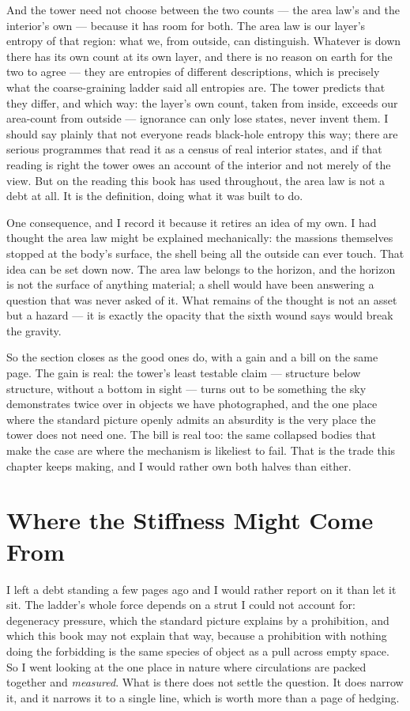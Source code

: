 \documentclass[fontsize=11pt,paper=a4,pagesize=auto,parskip=half-]{scrbook}
\begin{document}
And the tower need not choose between the two counts --- the area law's and the interior's own --- because it has room for both. The area law is our layer's entropy of that region: what we, from outside, can distinguish. Whatever is down there has its own count at its own layer, and there is no reason on earth for the two to agree --- they are entropies of different descriptions, which is precisely what the coarse-graining ladder said all entropies are. The tower predicts that they differ, and which way: the layer's own count, taken from inside, exceeds our area-count from outside --- ignorance can only lose states, never invent them. I should say plainly that not everyone reads black-hole entropy this way; there are serious programmes that read it as a census of real interior states, and if that reading is right the tower owes an account of the interior and not merely of the view. But on the reading this book has used throughout, the area law is not a debt at all. It is the definition, doing what it was built to do.

One consequence, and I record it because it retires an idea of my own. I had thought the area law might be explained mechanically: the massions themselves stopped at the body's surface, the shell being all the outside can ever touch. That idea can be set down now. The area law belongs to the horizon, and the horizon is not the surface of anything material; a shell would have been answering a question that was never asked of it. What remains of the thought is not an asset but a hazard --- it is exactly the opacity that the sixth wound says would break the gravity.

So the section closes as the good ones do, with a gain and a bill on the same page. The gain is real: the tower's least testable claim --- structure below structure, without a bottom in sight --- turns out to be something the sky demonstrates twice over in objects we have photographed, and the one place where the standard picture openly admits an absurdity is the very place the tower does not need one. The bill is real too: the same collapsed bodies that make the case are where the mechanism is likeliest to fail. That is the trade this chapter keeps making, and I would rather own both halves than either.


\section{Where the Stiffness Might Come From}

I left a debt standing a few pages ago and I would rather report on it than let it sit. The ladder's whole force depends on a strut I could not account for: degeneracy pressure, which the standard picture explains by a prohibition, and which this book may not explain that way, because a prohibition with nothing doing the forbidding is the same species of object as a pull across empty space. So I went looking at the one place in nature where circulations are packed together and \emph{measured}. What is there does not settle the question. It does narrow it, and it narrows it to a single line, which is worth more than a page of hedging.
\end{document}
